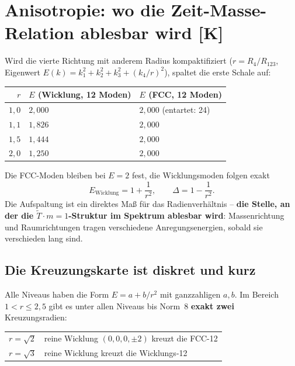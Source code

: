 \chapter{Anisotropie: wo die Zeit-Masse-Relation ablesbar wird [K]}

Wird die vierte Richtung mit anderem Radius kompaktifiziert
($r = R_4/R_{123}$, Eigenwert $E(k) = k_1^2+k_2^2+k_3^2+(k_4/r)^2$),
spaltet die erste Schale auf:

\begin{center}
\begin{tabular}{rll}
\toprule
$r$ & $E$ (Wicklung, 12 Moden) & $E$ (FCC, 12 Moden) \\
\midrule
$1{,}0$ & $2{,}000$ & $2{,}000$ (entartet: 24) \\
$1{,}1$ & $1{,}826$ & $2{,}000$ \\
$1{,}5$ & $1{,}444$ & $2{,}000$ \\
$2{,}0$ & $1{,}250$ & $2{,}000$ \\
\bottomrule
\end{tabular}
\end{center}

Die FCC-Moden bleiben bei $E = 2$ fest, die Wicklungsmoden folgen
exakt
\begin{equation}
  E_\text{Wicklung} = 1 + \frac{1}{r^2},
  \qquad
  \Delta = 1 - \frac{1}{r^2}.
\end{equation}
Die Aufspaltung ist ein direktes Maß für das Radienverhältnis --
\textbf{die Stelle, an der die $\tilde T\cdot m = 1$-Struktur im
Spektrum ablesbar wird}: Massenrichtung und Raumrichtungen tragen
verschiedene Anregungsenergien, sobald sie verschieden lang sind.

\section{Die Kreuzungskarte ist diskret und kurz}

Alle Niveaus haben die Form $E = a + b/r^2$ mit ganzzahligen
$a, b$. Im Bereich $1 < r \le 2{,}5$ gibt es unter allen Niveaus bis
Norm~8 \textbf{exakt zwei} Kreuzungsradien:

\begin{center}
\begin{tabular}{ll}
\toprule
$r = \sqrt{2}$ & reine Wicklung $(0,0,0,\pm2)$ kreuzt die FCC-12 \\
$r = \sqrt{3}$ & reine Wicklung kreuzt die Wicklungs-12 \\
\bottomrule
\end{tabular}
\end{center}

